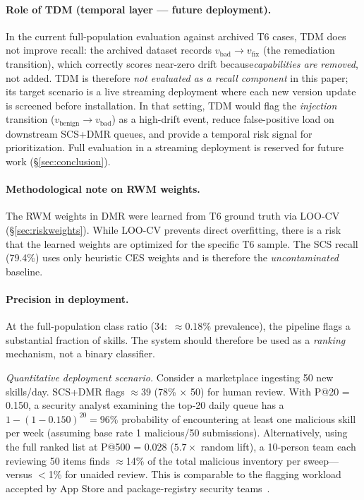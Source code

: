 \paragraph{Role of TDM (temporal layer --- future deployment).}
In the current full-population evaluation against archived T6 cases,
TDM does not improve recall: the archived dataset records
$v_{\text{bad}}\to v_{\text{fix}}$ (the remediation transition), which
correctly scores near-zero drift because\emph{capabilities are removed},
not added. TDM is therefore \emph{not evaluated as a recall component}
in this paper; its target scenario is a live streaming deployment
where each new version update is screened before installation.
In that setting, TDM would flag the \emph{injection} transition
($v_{\text{benign}}\to v_{\text{bad}}$) as a high-drift event,
reduce false-positive load on downstream SCS+DMR queues, and
provide a temporal risk signal for prioritization.
Full evaluation in a streaming deployment is reserved for future work
(\S\ref{sec:conclusion}).

\paragraph{Methodological note on RWM weights.}
The RWM weights in DMR were learned from T6 ground truth
via LOO-CV (\S\ref{sec:riskweights}). While LOO-CV
prevents direct overfitting, there is a risk that the
learned weights are optimized for the specific T6 sample.
The SCS recall (79.4\%) uses only heuristic CES weights
and is therefore the \emph{uncontaminated} baseline.

\paragraph{Precision in deployment.}
At the full-population class ratio (34:\NskillsDMR\ $\approx0.18\%$
prevalence), the pipeline flags a substantial fraction of
\NskillsDMR{} skills.
The system should therefore be used as a
\emph{ranking} mechanism, not a binary classifier.

\noindent\textit{Quantitative deployment scenario.}
Consider a marketplace ingesting 50 new skills/day.
SCS+DMR flags $\approx$39 (78\% × 50) for human review.
With P@20 = 0.150, a security analyst examining the
top-20 daily queue has a $1 - (1-0.150)^{20} = 96\%$
probability of encountering at least one malicious skill
per week (assuming base rate 1 malicious/50 submissions).
Alternatively, using the full ranked list at P@500 = 0.028
($5.7\times$ random lift), a 10-person team each reviewing
50 items finds $\approx$14\% of the total malicious inventory
per sweep---versus $<$1\% for unaided review.
This is comparable to the flagging workload accepted by
App Store and package-registry security teams~\cite{ladisa2023taxonomy}.

